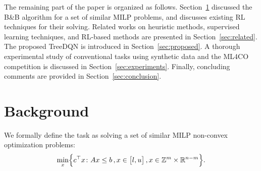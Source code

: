 \documentclass[preprint,12pt]{elsarticle} %
\theoremstyle{plain}
\theoremstyle{definition}
\theoremstyle{remark}
\begin{document}
The remaining part of the paper is organized as follows. Section~\ref{sec:background} discussed the B\&B algorithm for a set of similar MILP problems, and discusses existing RL techniques for their solving. Related works on heuristic methods, supervised learning techniques, and RL-based methods are presented in Section~\ref{sec:related}. The proposed TreeDQN is introduced in Section~\ref{sec:proposed}. A thorough experimental study of conventional tasks using synthetic data and the ML4CO competition is discussed in Section~\ref{sec:experiments}. Finally, concluding comments are provided in Section~\ref{sec:conclusion}.

\section{Background}\label{sec:background}

We formally define the task as solving a set of similar MILP non-convex optimization problems:
\begin{equation}
  \min_{x}\Bigl\{
    c^\top x
    \colon A x \leq b
    \,, x \in \bigl[l, u\bigr]
    \,, x \in \mathbb{Z}^m \times \mathbb{R}^{n-m}
  \Bigr\}.
  \label{eq:milp_setup}
\end{equation}
\end{document}
